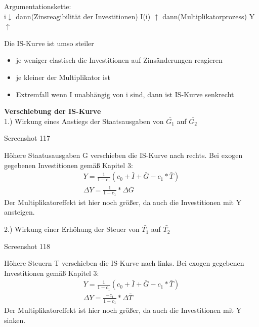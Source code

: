 \documentclass[11pt]{article}
\begin{document}
\begin{enumerate}
Argumentationskette:\\
i\(\downarrow\) dann(Zinsreagibilität der Investitionen) I(i) \(\uparrow\) dann(Multiplikatorprozess) Y\(\uparrow\)


Die IS-Kurve ist umso steiler
\begin{itemize}
\item je weniger elastisch die Investitionen auf Zinsänderungen reagieren
\item je kleiner der Multiplikator ist
\item Extremfall wenn I unabhängig von i sind, dann ist IS-Kurve senkrecht
\end{itemize}

\textbf{Verschiebung der IS-Kurve}\\
1.) Wirkung eines Anstiegs der Staatsausgaben von \(\bar{G_1}\) auf \(\bar{G_2}\)

Screenshot 117

Höhere Staatusausgaben G verschieben die IS-Kurve nach rechts. Bei exogen gegebenen Investitionen gemäß Kapitel 3:
\begin{equation*}
\begin{aligned}
Y = \frac{1}{1-c_1}(c_0 + \bar{I} + \bar{G} - c_1 * \bar{T})\\
\Delta Y = \frac{1}{1-c_1}*\Delta\bar{G}
\end{aligned}
\end{equation*}
Der Multiplikatoreffekt ist hier noch größer, da auch die Investitionen mit Y ansteigen.

2.) Wirkung einer Erhöhung der Steuer von \(\bar{T_1}\) auf \(\bar{T_2}\)

Screenshot 118

Höhere Steuern T verschieben die IS-Kurve nach links. Bei exogen gegebenen Investitionen gemäß Kapitel 3:
\begin{equation*}
\begin{aligned}
Y = \frac{1}{1-c_1}(c_0 + \bar{I} + \bar{G} - c_1 * \bar{T})\\
\Delta Y = \frac{-c_1}{1-c_1}*\Delta\bar{T}
\end{aligned}
\end{equation*}
Der Multiplikatoreffekt ist hier noch größer, da auch die Investitionen mit Y sinken.
\end{enumerate}
\end{document}
